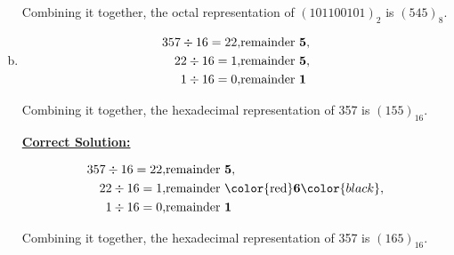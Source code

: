 \documentclass[12pt]{article}
\begin{document}
\begin{enumerate}[a.]
    Combining it together, the octal representation of $(101100101)_2$ is
    $(545)_8$.

    \item

    \begin{align*}
        357 \div 16 = 22, &\text{remainder \textbf{5}},\\
        22 \div 16 = 1, &\text{remainder \textbf{5}},\\
        1 \div 16 = 0, &\text{remainder \textbf{1}}
    \end{align*}

    Combining it together, the hexadecimal representation of 357 is $(155)_{16}$.

    \begin{mdframed}
        \underline{\textbf{Correct Solution:}}

        \bigskip

        \begin{align*}
            357 \div 16 = 22, &\text{remainder \textbf{5}},\\
            22 \div 16 = 1, &\text{remainder \color{red}\textbf{6}}\color{black},\\
            1 \div 16 = 0, &\text{remainder \textbf{1}}
        \end{align*}

        Combining it together, the hexadecimal representation of 357 is \color{red}\textbf{$(165)_{16}$}\color{black}.

    \end{mdframed}

\end{enumerate}
\end{document}
